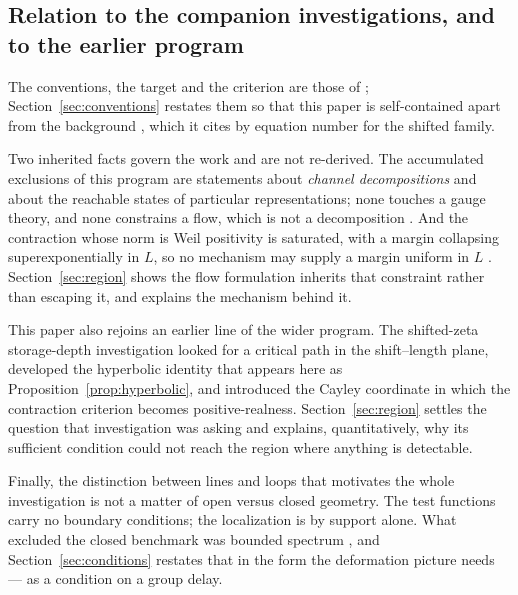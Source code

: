 \subsection*{Relation to the companion investigations, and to the earlier program}

The conventions, the target and the criterion are those of
\cite{InverseBulk,Selection}; Section~\ref{sec:conventions} restates them so that
this paper is self-contained apart from the background \cite{Background}, which it
cites by equation number for the shifted family.

Two inherited facts govern the work and are not re-derived. The accumulated
exclusions of this program are statements about \emph{channel decompositions} and
about the reachable states of particular representations; none touches a gauge
theory, and none constrains a flow, which is not a decomposition
\cite{ExclusionMap}. And the contraction whose norm is Weil positivity is
saturated, with a margin collapsing superexponentially in $L$, so no mechanism
may supply a margin uniform in $L$ \cite{Selection}. Section~\ref{sec:region}
shows the flow formulation inherits that constraint rather than escaping it, and
explains the mechanism behind it.

This paper also rejoins an earlier line of the wider program. The shifted-zeta
storage-depth investigation \cite{CriticalPath,CumulativePath} looked for a
critical path in the shift--length plane, developed the hyperbolic identity that
appears here as Proposition~\ref{prop:hyperbolic}, and introduced the Cayley
coordinate in which the contraction criterion becomes positive-realness.
Section~\ref{sec:region} settles the question that investigation was asking and
explains, quantitatively, why its sufficient condition could not reach the region
where anything is detectable.

Finally, the distinction between lines and loops that motivates the whole
investigation is not a matter of open versus closed geometry. The test functions
carry no boundary conditions; the localization is by support alone. What excluded
the closed benchmark was bounded spectrum \cite{Selection,Bottleneck}, and
Section~\ref{sec:conditions} restates that in the form the deformation picture
needs --- as a condition on a group delay.
